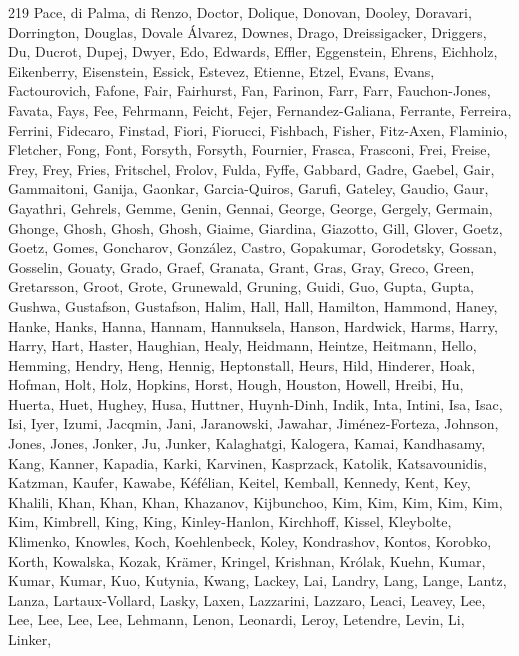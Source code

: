 \documentclass{aa}
\begin{document}
\begin{thebibliography}{219}
{{			Pace}, {di Palma}, {di Renzo}, {Doctor}, {Dolique}, {Donovan}, {Dooley}, {Doravari}, {Dorrington}, {Douglas}, {Dovale {\'A}lvarez}, {Downes}, {Drago}, {Dreissigacker}, {Driggers}, {Du}, {Ducrot}, {Dupej}, {Dwyer}, {Edo}, {Edwards}, {Effler}, {Eggenstein}, {Ehrens}, {Eichholz}, {Eikenberry}, {Eisenstein}, {Essick}, {Estevez}, {Etienne}, {Etzel}, {Evans}, {Evans}, {Factourovich}, {Fafone}, {Fair}, {Fairhurst}, {Fan}, {Farinon}, {Farr}, {Farr}, {Fauchon-Jones}, {Favata}, {Fays}, {Fee}, {Fehrmann}, {Feicht}, {Fejer}, {Fernandez-Galiana}, {Ferrante}, {Ferreira}, {Ferrini}, {Fidecaro}, {Finstad}, {Fiori}, {Fiorucci}, {Fishbach}, {Fisher}, {Fitz-Axen}, {Flaminio}, {Fletcher}, {Fong}, {Font}, {Forsyth}, {Forsyth}, {Fournier}, {Frasca}, {Frasconi}, {Frei}, {Freise}, {Frey}, {Frey}, {Fries}, {Fritschel}, {Frolov}, {Fulda}, {Fyffe}, {Gabbard}, {Gadre}, {Gaebel}, {Gair}, {Gammaitoni}, {Ganija}, {Gaonkar}, {Garcia-Quiros}, {Garufi}, {Gateley}, {Gaudio}, {Gaur}, {Gayathri}, {Gehrels}, {Gemme}, {Genin}, {Gennai},
		{George}, {George}, {Gergely}, {Germain}, {Ghonge}, {Ghosh}, {Ghosh}, {Ghosh}, {Giaime}, {Giardina}, {Giazotto}, {Gill}, {Glover}, {Goetz}, {Goetz}, {Gomes}, {Goncharov}, {Gonz{\'a}lez}, {Castro}, {Gopakumar}, {Gorodetsky}, {Gossan}, {Gosselin}, {Gouaty}, {Grado}, {Graef}, {Granata}, {Grant}, {Gras}, {Gray}, {Greco}, {Green}, {Gretarsson}, {Groot}, {Grote}, {Grunewald}, {Gruning}, {Guidi}, {Guo}, {Gupta}, {Gupta}, {Gushwa}, {Gustafson}, {Gustafson}, {Halim}, {Hall}, {Hall}, {Hamilton}, {Hammond}, {Haney}, {Hanke}, {Hanks}, {Hanna}, {Hannam}, {Hannuksela}, {Hanson}, {Hardwick}, {Harms}, {Harry}, {Harry}, {Hart}, {Haster}, {Haughian}, {Healy}, {Heidmann}, {Heintze}, {Heitmann}, {Hello}, {Hemming}, {Hendry}, {Heng}, {Hennig}, {Heptonstall}, {Heurs}, {Hild}, {Hinderer}, {Hoak}, {Hofman}, {Holt}, {Holz}, {Hopkins}, {Horst}, {Hough}, {Houston}, {Howell}, {Hreibi}, {Hu}, {Huerta}, {Huet}, {Hughey}, {Husa}, {Huttner}, {Huynh-Dinh}, {Indik}, {Inta}, {Intini}, {Isa}, {Isac}, {Isi}, {Iyer}, {Izumi}, {Jacqmin}, {Jani},
		{Jaranowski}, {Jawahar}, {Jim{\'e}nez-Forteza}, {Johnson}, {Jones}, {Jones}, {Jonker}, {Ju}, {Junker}, {Kalaghatgi}, {Kalogera}, {Kamai}, {Kandhasamy}, {Kang}, {Kanner}, {Kapadia}, {Karki}, {Karvinen}, {Kasprzack}, {Katolik}, {Katsavounidis}, {Katzman}, {Kaufer}, {Kawabe}, {K{\'e}f{\'e}lian}, {Keitel}, {Kemball}, {Kennedy}, {Kent}, {Key}, {Khalili}, {Khan}, {Khan}, {Khan}, {Khazanov}, {Kijbunchoo}, {Kim}, {Kim}, {Kim}, {Kim}, {Kim}, {Kim}, {Kimbrell}, {King}, {King}, {Kinley-Hanlon}, {Kirchhoff}, {Kissel}, {Kleybolte}, {Klimenko}, {Knowles}, {Koch}, {Koehlenbeck}, {Koley}, {Kondrashov}, {Kontos}, {Korobko}, {Korth}, {Kowalska}, {Kozak}, {Kr{\"a}mer}, {Kringel}, {Krishnan}, {Kr{\'o}lak}, {Kuehn}, {Kumar}, {Kumar}, {Kumar}, {Kuo}, {Kutynia}, {Kwang}, {Lackey}, {Lai}, {Landry}, {Lang}, {Lange}, {Lantz}, {Lanza}, {Lartaux-Vollard}, {Lasky}, {Laxen}, {Lazzarini}, {Lazzaro}, {Leaci}, {Leavey}, {Lee}, {Lee}, {Lee}, {Lee}, {Lee}, {Lehmann}, {Lenon}, {Leonardi}, {Leroy}, {Letendre}, {Levin}, {Li}, {Linker},
}
\end{thebibliography}
\end{document}

